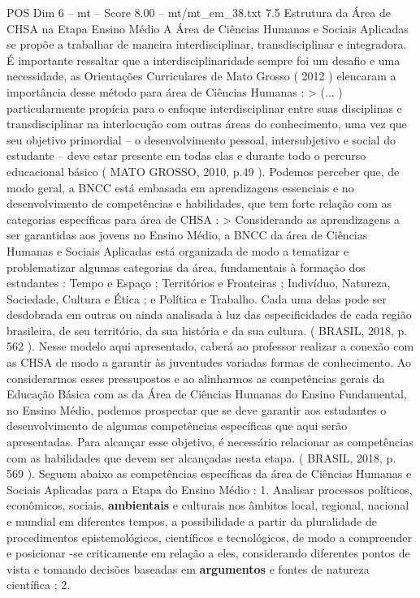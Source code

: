 \begin{textsample}{POS Dim 6 – mt – Score 8.00 – mt/mt\_em\_38.txt}  \label{ex:f6_pos_165}
7.5 Estrutura da Área de CHSA na Etapa Ensino Médio A Área de Ciências Humanas e Sociais Aplicadas se propõe a trabalhar de maneira interdisciplinar, transdisciplinar e integradora.
É importante ressaltar que a interdisciplinaridade sempre foi um desafio e uma necessidade, as Orientações Curriculares de Mato Grosso ( 2012 ) elencaram a importância desse método para área de Ciências Humanas : > (... ) particularmente propícia para o enfoque interdisciplinar entre suas disciplinas e transdisciplinar na interlocução com outras áreas do conhecimento, uma vez que seu objetivo primordial – o desenvolvimento pessoal, intersubjetivo e social do estudante – deve estar presente em todas elas e durante todo o percurso educacional básico ( MATO GROSSO, 2010, p.49 ).
Podemos perceber que, de modo geral, a BNCC está embasada em aprendizagens essenciais e no desenvolvimento de competências e habilidades, que tem forte relação com as categorias específicas para área de CHSA : > Considerando as aprendizagens a ser garantidas aos jovens no Ensino Médio, a BNCC da área de Ciências Humanas e Sociais Aplicadas está organizada de modo a tematizar e problematizar algumas categorias da área, fundamentais à formação dos estudantes : Tempo e Espaço ; Territórios e Fronteiras ; Indivíduo, Natureza, Sociedade, Cultura e Ética ; e Política e Trabalho.
Cada uma delas pode ser desdobrada em outras ou ainda analisada à luz das especificidades de cada região brasileira, de seu território, da sua história e da sua cultura. ( BRASIL, 2018, p. 562 ).
Nesse modelo aqui apresentado, caberá ao professor realizar a conexão com as CHSA de modo a garantir às juventudes variadas formas de conhecimento.
Ao considerarmos esses pressupostos e ao alinharmos as competências gerais da Educação Básica com as da Área de Ciências Humanas do Ensino Fundamental, no Ensino Médio, podemos prospectar que se deve garantir aos estudantes o desenvolvimento de algumas competências específicas que aqui serão apresentadas.
Para alcançar esse objetivo, é necessário relacionar as competências com as habilidades que devem ser alcançadas nesta etapa. ( BRASIL, 2018, p. 569 ).
Seguem abaixo as competências específicas da área de Ciências Humanas e Sociais Aplicadas para a Etapa do Ensino Médio : 1.
Analisar processos políticos, econômicos, sociais, \textbf{ambientais} e culturais nos âmbitos local, regional, nacional e mundial em diferentes tempos, a possibilidade a partir da pluralidade de procedimentos epistemológicos, científicos e tecnológicos, de modo a compreender e posicionar -se criticamente em relação a eles, considerando diferentes pontos de vista e tomando decisões baseadas em \textbf{argumentos} e fontes de natureza científica ; 2.

\end{textsample}
